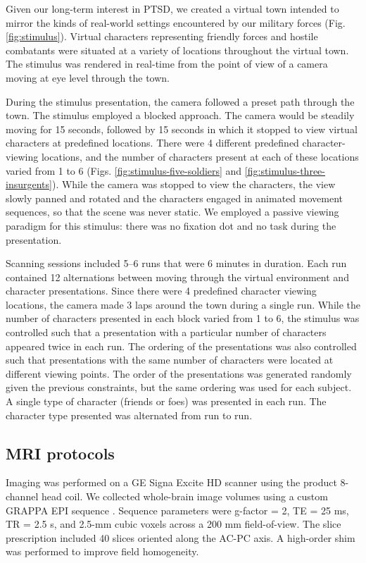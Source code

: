 \documentclass[review,1p,authoryear]{elsarticle}
\begin{document}
Given our long-term interest in PTSD, we created a virtual town intended to mirror the kinds of real-world settings encountered by our military forces (Fig. \ref{fig:stimulus}).
Virtual characters representing friendly forces and hostile combatants were situated at a variety of locations throughout the virtual town.
The stimulus was rendered in real-time from the point of view of a camera moving at eye level through the town. 

During the stimulus presentation, the camera followed a preset path through the town.
The stimulus employed a blocked approach. The camera would be steadily moving for 15 seconds, followed by 15 seconds in which it stopped to view virtual characters at predefined locations.
There were 4 different predefined character-viewing locations, and the number of characters present at each of these locations varied from 1 to 6 (Figs. \ref{fig:stimulus-five-soldiers} and \ref{fig:stimulus-three-insurgents}).
While the camera was stopped to view the characters, the view slowly panned and rotated and the characters engaged in animated movement sequences, so that the scene was never static.
We employed a passive viewing paradigm for this stimulus: there was no fixation dot and no task during the presentation.

Scanning sessions included 5--6 runs that were 6 minutes in duration.
Each run contained 12 alternations between moving through the virtual environment and character presentations. 
Since there were 4 predefined character viewing locations, the camera made 3 laps around the town during a single run.
While the number of characters presented in each block varied from 1 to 6, the stimulus was controlled such that a presentation with a particular number of characters appeared twice in each run.
The ordering of the presentations was also controlled such that presentations with the same number of characters were located at different viewing points.
The order of the presentations was generated randomly given the previous constraints, but the same ordering was used for each subject.
A single type of character (friends or foes) was presented in each run. 
The character type presented was alternated from run to run.

\subsection{MRI protocols}
Imaging was performed on a GE Signa Excite HD scanner using the product 8-channel head coil.
We collected whole-brain image volumes using a custom GRAPPA EPI sequence \citep{Griswold2002}. 
Sequence parameters were g-factor = 2,  TE = 25 ms, TR = 2.5 s, and  2.5-mm cubic voxels across a 200 mm field-of-view. 
The slice prescription included 40 slices oriented along the AC-PC axis. 
A high-order shim was  performed to improve field homogeneity.
\end{document}

